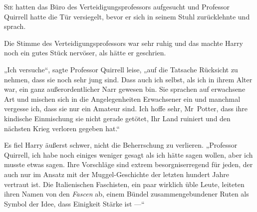 
\lettrine{S}{ie} hatten das Büro des Verteidigungsprofessors aufgesucht und Professor Quirrell hatte die Tür versiegelt, bevor er sich in seinem Stuhl zurücklehnte und sprach.

Die Stimme des Verteidigungsprofessors war sehr ruhig und das machte Harry noch ein gutes Stück nervöser, als hätte er geschrien.

„Ich versuche“, sagte Professor Quirrell leise, „auf die Tatsache Rücksicht zu nehmen, dass sie noch sehr jung sind. Dass auch ich selbst, als ich in ihrem Alter war, ein ganz außerordentlicher Narr gewesen bin. Sie sprachen auf erwachsene Art und mischen sich in die Angelegenheiten Erwachsener ein und manchmal vergesse ich, dass sie nur ein Amateur sind. Ich hoffe sehr, Mr~Potter, dass ihre kindische Einmischung sie nicht gerade getötet, Ihr Land ruiniert und den nächsten Krieg verloren gegeben hat.“

Es fiel Harry äußerst schwer, nicht die Beherrschung zu verlieren.
„Professor Quirrell, ich habe noch einiges weniger gesagt als ich hätte sagen wollen, aber ich musste etwas sagen. Ihre Vorschläge sind extrem besorgniserregend für jeden, der auch nur im Ansatz mit der Muggel-Geschichte der letzten hundert Jahre vertraut ist. Die Italienischen Faschisten, ein paar wirklich üble Leute, leiteten ihren Namen von den \emph{Fascen} ab, einem Bündel zusammengebundener Ruten als Symbol der Idee, dass Einigkeit Stärke ist —“

